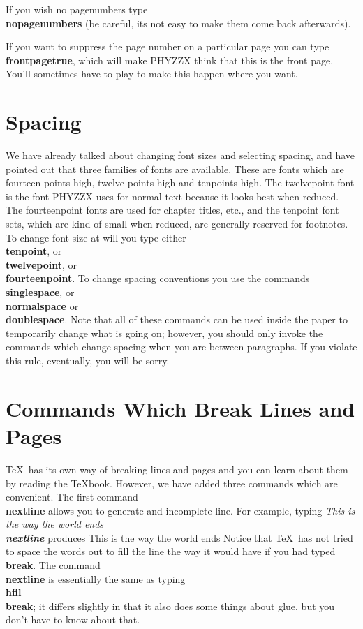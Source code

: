 \item\dash
If you wish no pagenumbers type {\bf \\nopagenumbers}
(be careful, its not easy to make them come back afterwards).
\item\star
If you want to suppress the page number on a particular page you
can type {\bf \\frontpagetrue}, which will make PHYZZX
think that this is the front page.
You'll sometimes have to play to make this happen where you want.
 
\section{Spacing}
 
We have already talked about changing font sizes and selecting
spacing, and have pointed out that three families of fonts are
available.
These are fonts which are fourteen points high, twelve points
high and tenpoints high.
The twelvepoint font is the font PHYZZX uses for normal text
because it looks best when reduced.
The fourteenpoint fonts are used for chapter titles, etc., and
the tenpoint font sets, which are kind of small when reduced,
are generally reserved for footnotes.
To change font size at will you type either
{\bf \\tenpoint}, or {\bf \\twelvepoint}, or
{\bf \\fourteenpoint}.
To change spacing conventions you use the commands
{\bf \\singlespace}, or {\bf \\normalspace}
or {\bf \\doublespace}.
Note that all of these commands can be used inside the paper
to temporarily change what is going on;
however, you should only invoke the
commands which change spacing when you are between paragraphs.
If you violate this rule, eventually, you
will be sorry.
 
\section{Commands Which Break Lines and Pages}
 
\TeX\ has its own way of breaking lines and pages and you can learn
about them by reading the \TeX book.
However, we have added three commands which are convenient.
The first command {\bf \\nextline} allows you to generate and
incomplete line.
For example, typing {\it This is the way the world ends \bf \\nextline}
produces \nextline
This is the way the world ends \nextline
Notice that \TeX\ has not tried to space the words out to fill
the line the way it would have if you had typed {\bf \\break}.
The command {\bf \\nextline} is essentially the same as typing
{\bf \\hfil\\break}; it differs slightly in that it also
does some things about glue, but you don't have to know about that.
 
